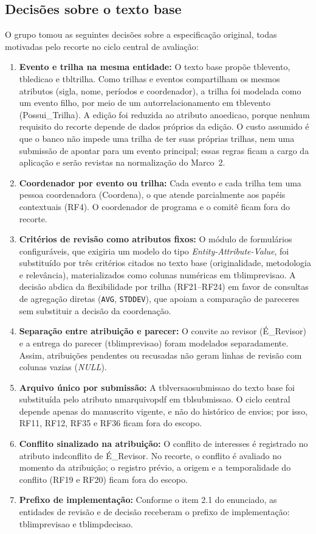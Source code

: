 \documentclass[12pt,a4paper]{article}
\newcommand{\tbus}{\textunderscore\allowbreak}
\newcommand{\tb}[1]{{\ttfamily\let\_\tbus #1}}
\newcommand{\rel}[1]{\textsf{#1}}
\begin{document}
\subsection{Decisões sobre o texto base}\label{sec:decisoes}
O grupo tomou as seguintes decisões sobre a especificação original, todas motivadas pelo
recorte no ciclo central de avaliação:
\begin{enumerate}
    \item \textbf{Evento e trilha na mesma entidade:} O texto base propõe \tb{tbl\_evento}, \tb{tbl\_edicao} e \tb{tbl\_trilha}. Como trilhas e eventos compartilham os mesmos atributos (sigla, nome, períodos e coordenador), a trilha foi modelada como um evento filho, por meio de um autorrelacionamento em \tb{tbl\_evento} (\rel{Possui\_Trilha}). A edição foi reduzida ao atributo \tb{ano\_edicao}, porque nenhum requisito do recorte depende de dados próprios da edição. O custo assumido é que o banco não impede uma trilha de ter suas próprias trilhas, nem uma submissão de apontar para um evento principal; essas regras ficam a cargo da aplicação e serão revistas na normalização do Marco~2.
    \item \textbf{Coordenador por evento ou trilha:} Cada evento e cada trilha tem uma pessoa coordenadora (\rel{Coordena}), o que atende parcialmente aos papéis contextuais (RF4). O coordenador de programa e o comitê ficam fora do recorte.
    \item \textbf{Critérios de revisão como atributos fixos:} O módulo de formulários configuráveis, que exigiria um modelo do tipo \textit{Entity-Attribute-Value}, foi substituído por três critérios citados no texto base (originalidade, metodologia e relevância), materializados como colunas numéricas em \tb{tbl\_imp\_revisao}. A decisão abdica da flexibilidade por trilha (RF21--RF24) em favor de consultas de agregação diretas (\texttt{AVG}, \texttt{STDDEV}), que apoiam a comparação de pareceres sem substituir a decisão da coordenação.
    \item \textbf{Separação entre atribuição e parecer:} O convite ao revisor (\rel{É\_Revisor}) e a entrega do parecer (\tb{tbl\_imp\_revisao}) foram modelados separadamente. Assim, atribuições pendentes ou recusadas não geram linhas de revisão com colunas vazias (\textit{NULL}).
    \item \textbf{Arquivo único por submissão:} A \tb{tbl\_versao\_submissao} do texto base foi substituída pelo atributo \tb{nm\_arquivo\_pdf} em \tb{tbl\_submissao}. O ciclo central depende apenas do manuscrito vigente, e não do histórico de envios; por isso, RF11, RF12, RF35 e RF36 ficam fora do escopo.
    \item \textbf{Conflito sinalizado na atribuição:} O conflito de interesses é registrado no atributo \tb{ind\_conflito} de \rel{É\_Revisor}. No recorte, o conflito é avaliado no momento da atribuição; o registro prévio, a origem e a temporalidade do conflito (RF19 e RF20) ficam fora do escopo.
    \item \textbf{Prefixo de implementação:} Conforme o item 2.1 do enunciado, as entidades de revisão e de decisão receberam o prefixo de implementação: \tb{tbl\_imp\_revisao} e \tb{tbl\_imp\_decisao}.
\end{enumerate}
\end{document}
